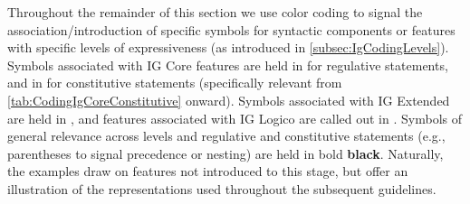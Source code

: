 Throughout the remainder of this section we use color coding to signal the association/introduction of specific symbols for syntactic components or features with specific levels of expressiveness (as introduced in  \cref{subsec:IgCodingLevels}). Symbols associated with IG Core features are held in \textcolor{\corecolor}{\corecolorname} for regulative statements, and in \textcolor{\corecolorconst}{\corecolorconstname} for constitutive statements (specifically relevant from \cref{tab:CodingIgCoreConstitutive} onward). Symbols associated with IG Extended are held in \textcolor{\extendedcolor}{\extendedcolorname}, and features associated with IG Logico are called out in \textcolor{\logicocolor}{\logicocolorname}. Symbols of general relevance across levels and regulative and constitutive statements (e.g., parentheses to signal precedence or nesting) are held in bold \textbf{black}. Naturally, the examples draw on features not introduced to this stage, but offer an illustration of the representations used throughout the subsequent guidelines. 

